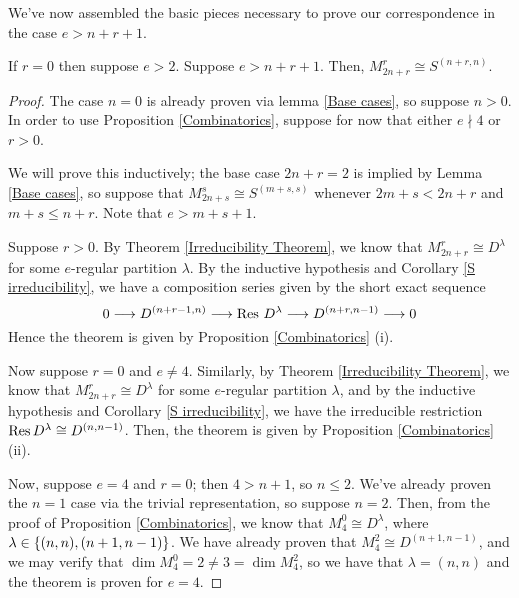 \documentclass{amsart}
\begin{document}
We've now assembled the basic pieces necessary to prove our correspondence in the case $e > n + r + 1$.

\begin{theorem}\label{Correspondence Theorem}
  If $r = 0$ then suppose $e > 2$.
  Suppose $e > n + r + 1$.
  Then, $M_{2n + r}^r \cong S^{(n+r,n)}$.
\end{theorem}
\begin{proof}
  The case $n = 0$ is already proven via lemma \ref{Base cases}, so suppose $n > 0$.
  In order to use Proposition \ref{Combinatorics}, suppose for now that either $e \nmid 4$ or $r > 0$.

  We will prove this inductively; the base case $2n + r = 2$ is implied by Lemma \ref{Base cases}, so suppose that $M_{2n + s}^s \cong S^{(m+s,s)}$ whenever $2m + s < 2n + r$ and $m + s \leq n + r$.
  Note that $e > m + s + 1$.

  Suppose $r > 0$.
  By Theorem \ref{Irreducibility Theorem}, we know that $M_{2n + r}^r \cong D^\lambda$ for some $e$-regular partition $\lambda$.
  By the inductive hypothesis and Corollary \ref{S irreducibility}, we have a composition series given by the short exact sequence
  \begin{equation}
    \label{Composition Series} 0 \longrightarrow D^{(n + r - 1,n)} \longrightarrow \operatorname{Res} \, D^\lambda \longrightarrow D^{(n+r,n-1)} \longrightarrow 0
   \end{equation}
  Hence the theorem is given by Proposition \ref{Combinatorics} (i).

  Now suppose $r = 0$ and $e \neq 4$.
  Similarly, by Theorem \ref{Irreducibility Theorem}, we know that $M_{2n + r}^r \cong D^\lambda$ for some $e$-regular partition $\lambda$, and by the inductive hypothesis and Corollary \ref{S irreducibility}, we have the irreducible restriction $\operatorname{Res} D^\lambda \cong D^{(n,n-1)}$.
  Then, the theorem is given by Proposition \ref{Combinatorics} (ii).

  Now, suppose $e = 4$ and $r = 0$;
  then $4 > n + 1$, so $n \leq 2$.
  We've already proven the $n = 1$ case via the trivial representation, so suppose $n = 2$.
  Then, from the proof of Proposition \ref{Combinatorics}, we know that $M_{4}^0 \cong D^\lambda$, where $\lambda \in \left\{ (n,n), (n+1,n-1) \right\}$.
  We have already proven that $M_4^2 \cong D^{(n+1,n-1)}$, and we may verify that $\dim M_4^0 = 2 \neq 3 = \dim M_4^2$, so we have that $\lambda = (n,n)$ and the theorem is proven for $e = 4$.
\end{proof}
\end{document}
